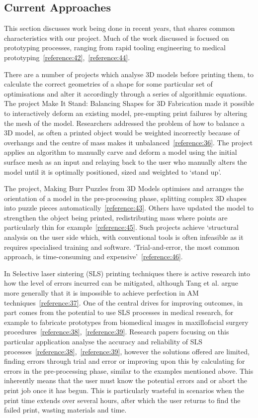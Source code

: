 \documentclass[11pt]{article} %
\begin{document}
\subsection{Current Approaches}
This section discusses work being done in recent years, that shares common characteristics with our project. Much of the work discussed is focused on prototyping processes, ranging from rapid tooling engineering to medical prototyping~\ref{reference:42},~\ref{reference:44}. 

There are a number of projects which analyse 3D models before printing them, to calculate the correct geometries of a shape for some particular set of optimisations and alter it accordingly through a series of algorithmic equations. The project Make It Stand: Balancing Shapes for 3D Fabrication made it possible to interactively deform an existing model, pre-empting print failures by altering the mesh of the model. Researchers addressed the problem of how to balance a 3D model, as often a printed object would be weighted incorrectly because of overhangs and the centre of mass makes it unbalanced~\ref{reference:36}. The project applies an algorithm to manually carve and deform a model using the initial surface mesh as an input and relaying back to the user who manually alters the model until it is optimally positioned, sized and weighted to ‘stand up’. 

The project, Making Burr Puzzles from 3D Models optimises and arranges the orientation of a model in the pre-processing phase, splitting complex 3D shapes into puzzle pieces automatically~\ref{reference:43}. Others have updated the model to strengthen the object being printed, redistributing mass where points are particularly thin for example~\ref{reference:45}. Such projects achieve ‘structural analysis on the user side which, with conventional tools is often infeasible as it requires specialised training and software. ‘Trial-and-error, the most common approach, is time-consuming and expensive’~\ref{reference:46}. 

In Selective laser sintering (SLS) printing techniques there is active research into how the level of errors incurred can be mitigated, although Tang et al. argue more generally that it is impossible to achieve perfection in AM techniques~\ref{reference:37}. One of the central drives for improving outcomes, in part comes from the potential to use SLS processes in medical research, for example to fabricate prototypes from biomedical images in maxillofacial surgery procedures~\ref{reference:38},~\ref{reference:39}. Research papers focusing on this particular application analyse the accuracy and reliability of SLS processes~\ref{reference:38},~\ref{reference:39}, however the solutions offered are limited, finding errors through trial and error or improving upon this by calculating for errors in the pre-processing phase, similar to the examples mentioned above. This inherently means that the user must know the potential errors and or abort the print job once it has begun. This is particularly wasteful in scenarios when the print time extends over several hours, after which the user returns to find the failed print, wasting materials and time. 
\end{document}
